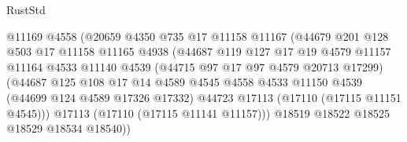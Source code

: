 \begin{lexlean}{RustStd}
\begin{coremodule}
                                      @11169
                                      @4558
                                      (@20659
                                        @4350
                                        @735
                                        @17
                                        @11158
                                        @11167
                                        (@44679
                                          @201
                                          @128
                                          @503
                                          @17
                                          @11158
                                          @11165
                                          @4938
                                          (@44687
                                            @119
                                            @127
                                            @17
                                            @19
                                            @4579
                                            @11157
                                            @11164
                                            @4533
                                            @11140
                                            @4539
                                            (@44715 @97 @17 @97 @4579 @20713 @17299)
                                            (@44687
                                              @125
                                              @108
                                              @17
                                              @14
                                              @4589
                                              @4545
                                              @4558
                                              @4533
                                              @11150
                                              @4539
                                              (@44699 @124 @4589 @17326 @17332)
                                              @44723
                                              @17113
                                              (@17110 (@17115 @11151 @4545)))
                                            @17113
                                            (@17110 (@17115 @11141 @11157)))
                                          @18519
                                          @18522
                                          @18525
                                          @18529
                                          @18534
                                          @18540))

\end{coremodule}
\end{lexlean}
